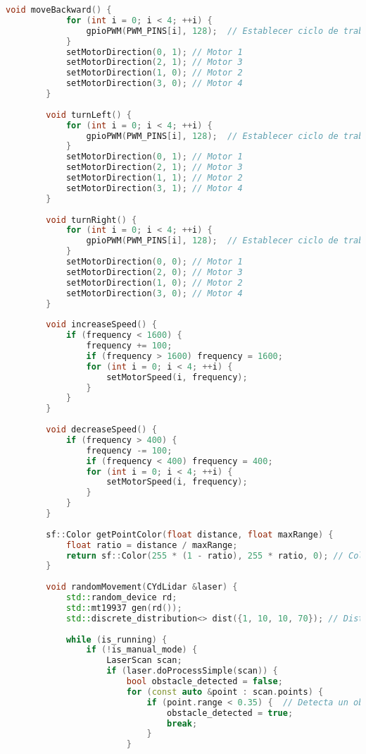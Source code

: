 \begin{lstlisting}[language={C++}, caption={Primera versi\'on del c\'odigo del sistema de control del robot}, label={PrimeraVersionCodigoRobot}]
        void moveBackward() {
            for (int i = 0; i < 4; ++i) {
                gpioPWM(PWM_PINS[i], 128);  // Establecer ciclo de trabajo al 50%
            }
            setMotorDirection(0, 1); // Motor 1
            setMotorDirection(2, 1); // Motor 3
            setMotorDirection(1, 0); // Motor 2
            setMotorDirection(3, 0); // Motor 4
        }
        
        void turnLeft() {
            for (int i = 0; i < 4; ++i) {
                gpioPWM(PWM_PINS[i], 128);  // Establecer ciclo de trabajo al 50%
            }
            setMotorDirection(0, 1); // Motor 1
            setMotorDirection(2, 1); // Motor 3
            setMotorDirection(1, 1); // Motor 2
            setMotorDirection(3, 1); // Motor 4
        }
        
        void turnRight() {
            for (int i = 0; i < 4; ++i) {
                gpioPWM(PWM_PINS[i], 128);  // Establecer ciclo de trabajo al 50%
            }
            setMotorDirection(0, 0); // Motor 1
            setMotorDirection(2, 0); // Motor 3
            setMotorDirection(1, 0); // Motor 2
            setMotorDirection(3, 0); // Motor 4
        }
        
        void increaseSpeed() {
            if (frequency < 1600) {
                frequency += 100;
                if (frequency > 1600) frequency = 1600;
                for (int i = 0; i < 4; ++i) {
                    setMotorSpeed(i, frequency);
                }
            }
        }
        
        void decreaseSpeed() {
            if (frequency > 400) {
                frequency -= 100;
                if (frequency < 400) frequency = 400;
                for (int i = 0; i < 4; ++i) {
                    setMotorSpeed(i, frequency);
                }
            }
        }
        
        sf::Color getPointColor(float distance, float maxRange) {
            float ratio = distance / maxRange;
            return sf::Color(255 * (1 - ratio), 255 * ratio, 0); // Color de rojo a verde
        }
        
        void randomMovement(CYdLidar &laser) {
            std::random_device rd;
            std::mt19937 gen(rd());
            std::discrete_distribution<> dist({1, 10, 10, 70}); // Distribuci\'on para la probabilidad de movimiento
        
            while (is_running) {
                if (!is_manual_mode) {
                    LaserScan scan;
                    if (laser.doProcessSimple(scan)) {
                        bool obstacle_detected = false;
                        for (const auto &point : scan.points) {
                            if (point.range < 0.35) {  // Detecta un obst\'aculo a 35 cm
                                obstacle_detected = true;
                                break;
                            }
                        }
        

\end{lstlisting}
